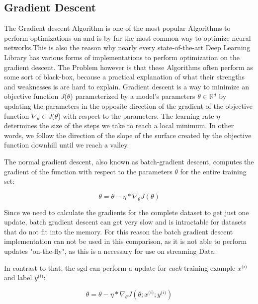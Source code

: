 \documentclass[12pt,oneside,a4paper,parskip]{scrbook}
\newcommand{\R}{\mathbb{R}}
\begin{document}
\subsection{Gradient Descent}
The Gradient descent Algorithm is one of the most popular Algorithms to perform optimizations on and is by far the most 
common way to optimize neural networks.This is also the reason why nearly every state-of-the-art Deep Learning Library 
has various forms of implementations to perform optimization on the gradient descent. The Problem however is that these
Algorithms often perform as some sort of black-box, because a practical explanation of what their strengths and weaknesses 
is are hard to explain.
Gradient descent is a way to minimize an objective function \textit{J}($\theta$) parameterized by a model's parameters $\theta \in \R{}^d$ by 
updating the parameters in the opposite direction of the gradient of the objective function $\nabla_\theta \in $\textit{J}($\theta$) with respect to 
the parameters. The learning rate $\eta$ determines the size of the steps we take to reach a local minimum. In other words, 
we follow the direction of the slope of the surface created by the objective function downhill until we reach a valley. \cite{overvieDiffRSLVQ}

The normal gradient descent, also known as batch-gradient descent, computes the gradient of the function with 
respect to the parameters $\theta$ for the entire training set:

\begin{equation}
\theta = \theta - \eta * \nabla_\theta \textit{J}(\theta)
\end{equation}

Since we need to calculate the gradients for the complete dataset to get just one update, batch gradient descent can get very
slow and is intractable for datasets that do not fit into the memory. For this reason the batch gradient descent implementation
can not be used in this comparison, as it is not able to perform updates "on-the-fly", as this is a necessary for use on streaming Data. 

In contrast to that, the \ac{sgd} can perform a update for \textit{each} training example
$\textit{x}^\textit{(i)}$ and label $\textit{y}^\textit{(i)}$:

\begin{equation}
\theta = \theta - \eta * \nabla_\theta \textit{J}(\theta;\textit{x}^\textit{(i)};\textit{y}^\textit{(i)})
\end{equation}
\end{document}
